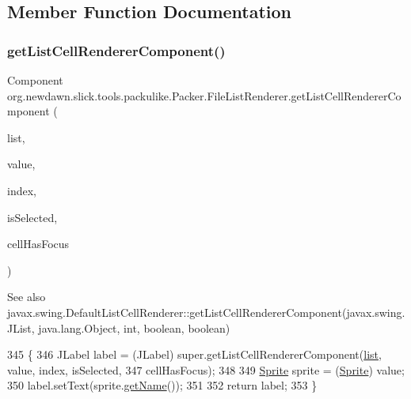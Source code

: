 \subsection{Member Function Documentation}
\mbox{\label{classorg_1_1newdawn_1_1slick_1_1tools_1_1packulike_1_1_packer_1_1_file_list_renderer_aa76e4932237103da9a918ad018944795}} 
\subsubsection{\texorpdfstring{get\+List\+Cell\+Renderer\+Component()}{getListCellRendererComponent()}}
{\footnotesize\ttfamily Component org.\+newdawn.\+slick.\+tools.\+packulike.\+Packer.\+File\+List\+Renderer.\+get\+List\+Cell\+Renderer\+Component (\begin{DoxyParamCaption}\item[{J\+List}]{list,  }\item[{Object}]{value,  }\item[{int}]{index,  }\item[{boolean}]{is\+Selected,  }\item[{boolean}]{cell\+Has\+Focus }\end{DoxyParamCaption})\hspace{0.3cm}{\ttfamily [inline]}}

\begin{DoxySeeAlso}{See also}
javax.\+swing.\+Default\+List\+Cell\+Renderer\+::get\+List\+Cell\+Renderer\+Component(javax.\+swing.\+J\+List, java.\+lang.\+Object, int, boolean, boolean) 
\end{DoxySeeAlso}

\begin{DoxyCode}
345                                                                                                            
                                \{
346             JLabel label = (JLabel) super.getListCellRendererComponent(\mbox{\hyperlink{classorg_1_1newdawn_1_1slick_1_1tools_1_1packulike_1_1_packer_a45e8438e951eb84f2efaf06e5ae481bd}{list}}, value, index, isSelected,
347                     cellHasFocus);
348             
349             \mbox{\hyperlink{class_sprite}{Sprite}} sprite = (\mbox{\hyperlink{class_sprite}{Sprite}}) value;
350             label.setText(sprite.\mbox{\hyperlink{classorg_1_1newdawn_1_1slick_1_1_image_a3d7329c13259ffebd9efc30deb5655fc}{getName}}());
351             
352             \textcolor{keywordflow}{return} label;
353         \}
\end{DoxyCode}
